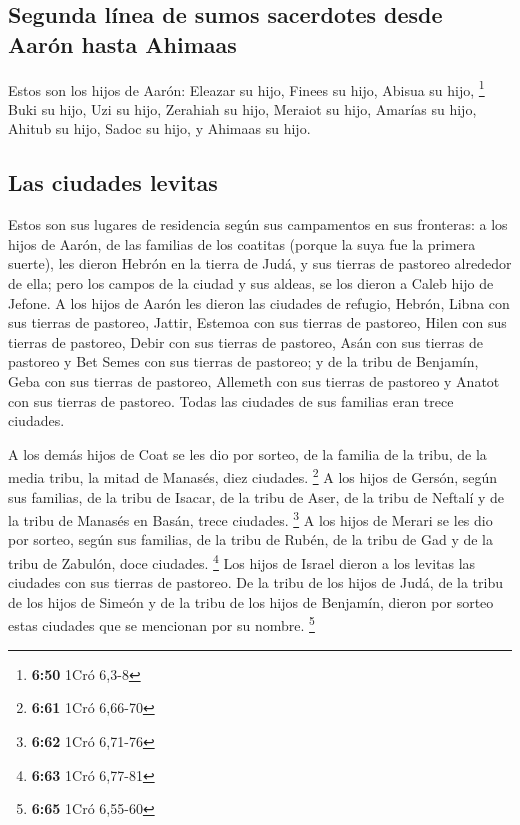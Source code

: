 \hypertarget{segunda-luxednea-de-sumos-sacerdotes-desde-aaruxf3n-hasta-ahimaas}{%
\subsection{Segunda línea de sumos sacerdotes desde Aarón hasta
Ahimaas}\label{segunda-luxednea-de-sumos-sacerdotes-desde-aaruxf3n-hasta-ahimaas}}

 Estos son los hijos de Aarón: Eleazar su hijo, Finees su
hijo, Abisua su hijo, \footnote{\textbf{6:50} 1Cró 6,3-8}
 Buki su hijo, Uzi su hijo, Zerahiah su hijo,
 Meraiot su hijo, Amarías su hijo, Ahitub su hijo,
 Sadoc su hijo, y Ahimaas su hijo.

\hypertarget{las-ciudades-levitas}{%
\subsection{Las ciudades levitas}\label{las-ciudades-levitas}}

 Estos son sus lugares de residencia según sus
campamentos en sus fronteras: a los hijos de Aarón, de las familias de
los coatitas (porque la suya fue la primera suerte),  les
dieron Hebrón en la tierra de Judá, y sus tierras de pastoreo alrededor
de ella;  pero los campos de la ciudad y sus aldeas, se
los dieron a Caleb hijo de Jefone.  A los hijos de Aarón
les dieron las ciudades de refugio, Hebrón, Libna con sus tierras de
pastoreo, Jattir, Estemoa con sus tierras de pastoreo, 
Hilen con sus tierras de pastoreo, Debir con sus tierras de pastoreo,
 Asán con sus tierras de pastoreo y Bet Semes con sus
tierras de pastoreo;  y de la tribu de Benjamín, Geba con
sus tierras de pastoreo, Allemeth con sus tierras de pastoreo y Anatot
con sus tierras de pastoreo. Todas las ciudades de sus familias eran
trece ciudades.

 A los demás hijos de Coat se les dio por sorteo, de la
familia de la tribu, de la media tribu, la mitad de Manasés, diez
ciudades. \footnote{\textbf{6:61} 1Cró 6,66-70}  A los
hijos de Gersón, según sus familias, de la tribu de Isacar, de la tribu
de Aser, de la tribu de Neftalí y de la tribu de Manasés en Basán, trece
ciudades. \footnote{\textbf{6:62} 1Cró 6,71-76}  A los
hijos de Merari se les dio por sorteo, según sus familias, de la tribu
de Rubén, de la tribu de Gad y de la tribu de Zabulón, doce ciudades.
\footnote{\textbf{6:63} 1Cró 6,77-81}  Los hijos de
Israel dieron a los levitas las ciudades con sus tierras de pastoreo.
 De la tribu de los hijos de Judá, de la tribu de los
hijos de Simeón y de la tribu de los hijos de Benjamín, dieron por
sorteo estas ciudades que se mencionan por su nombre. \footnote{\textbf{6:65}
  1Cró 6,55-60}

